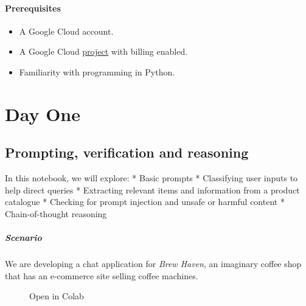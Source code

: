 \documentclass[
  letterpaper,
  DIV=11,
  numbers=noendperiod]{scrreprt}
\providecommand{\tightlist}{%
  \setlength{\itemsep}{0pt}\setlength{\parskip}{0pt}}\usepackage{longtable,booktabs,array}
\begin{document}
\hypertarget{prerequisites}{%
\subsection*{Prerequisites}\label{prerequisites}}

\begin{itemize}
\tightlist
\item
  A Google Cloud account.
\item
  A Google Cloud
  \href{https://cloud.google.com/resource-manager/docs/creating-managing-projects}{project}
  with billing enabled.
\item
  Familiarity with programming in Python.
\end{itemize}

\part{Day One}

\hypertarget{prompting-verification-and-reasoning}{%
\chapter{Prompting, verification and
reasoning}\label{prompting-verification-and-reasoning}}

In this notebook, we will explore: * Basic prompts * Classifying user
inputs to help direct queries * Extracting relevant items and
information from a product catalogue * Checking for prompt injection and
unsafe or harmful content * Chain-of-thought reasoning

\hypertarget{scenario}{%
\subsubsection{Scenario}\label{scenario}}

We are developing a chat application for \emph{Brew Haven}, an imaginary
coffee shop that has an e-commerce site selling coffee machines.

\begin{figure}

{\centering 

\href{https://colab.research.google.com/github/rastringer/building_apps_with_genai_studio/blob/main/1_prompting_and_verification.ipynb}{}

}

\caption{Open in Colab}

\end{figure}
\end{document}
